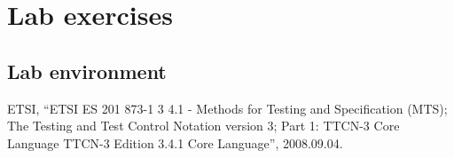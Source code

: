 \documentclass[a4paper]{article}
\begin{document}

\section{Lab exercises}

\subsection{Lab environment}

\begin{thebibliography}{9}

    ETSI,
    ``{ETSI} {ES} 201 873-1 3 4.1 - Methods for Testing and Specification ({MTS}); The
    Testing and Test Control Notation version 3; Part 1: {TTCN-3} Core Language {TTCN-3}
    Edition 3.4.1 Core Language'',
    2008.09.04.
\end{thebibliography}
\end{document}
